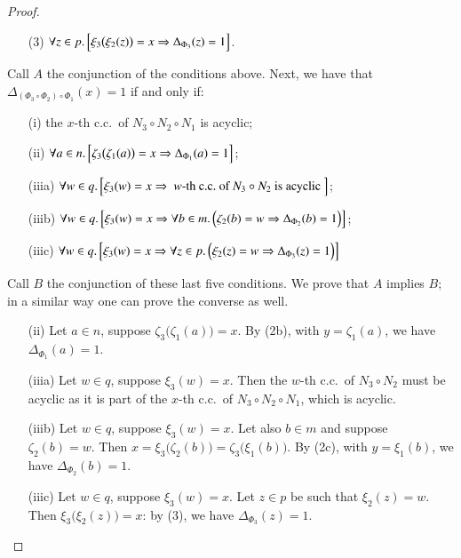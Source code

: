 \begin{proof}
\begin{enumerate}[labelindent=0pt]
        \item[(3)] $\forall z \in p \ldotp \Bigl[ \xi_3\bigl(\xi_2(z)\bigr) = x \implies \Delta_{\Phi_3} (z) = 1 \Bigr] $.
    \end{enumerate}
    Call $A$ the conjunction of the conditions above. Next, we have that $\Delta_{(\Phi_3 \circ \Phi_2) \circ \Phi_1}(x)=1$ if and only if:
    \begin{enumerate}[labelindent=0pt]
        \item[(i)] the $x$-th c.c.\ of $N_3 \circ N_2 \circ N_1$ is acyclic;
        \item[(ii)] $\forall a \in n \ldotp \Bigl[ \zeta_3 \bigl( \zeta_1(a) \bigr) =x \implies \Delta_{\Phi_1}(a)=1\Bigr]$;
        \item[(iiia)] $\forall w \in q \ldotp \Bigl[ \xi_3(w)=x \implies \text{ $w$-th c.c.\ of $N_3 \circ N_2$ is acyclic } \Bigr]$;
        \item[(iiib)] $\forall w \in q \ldotp \Bigl[ \xi_3(w)=x \implies \forall b \in m \ldotp \Bigl( \zeta_2(b)=w \implies \Delta_{\Phi_2}(b)=1 \Bigr) \Bigr]$;
        \item[(iiic)] $\forall w \in q \ldotp \Bigl[ \xi_3(w)=x \implies \forall z \in p \ldotp \Bigl( \xi_2(z)=w \implies \Delta_{\Phi_3}(z)=1 \Bigr) \Bigr]$
    \end{enumerate}
    Call $B$ the conjunction of these last five conditions. We prove that $A$ implies $B$; in a similar way one can prove the converse as well.
    \begin{enumerate}[labelindent=0pt]
        \item[(ii)] Let $a \in n$, suppose $\zeta_3\bigl(\zeta_1(a)\bigr) = x$. By (2b), with $y = \zeta_1(a)$, we have $\Delta_{\Phi_1}(a) = 1$.
        \item[(iiia)] Let $w \in q$, suppose $\xi_3(w)=x$. Then the $w$-th c.c.\ of $N_3 \circ N_2$ must be acyclic as it is part of the $x$-th c.c.\ of $N_3 \circ N_2 \circ N_1$, which is acyclic.
        \item[(iiib)] Let $w \in q$, suppose $\xi_3(w)=x$. Let also $b \in m$ and suppose $\zeta_2(b) = w$. Then $x = \xi_3\bigl( \zeta_2(b)\bigr) = \zeta_3 \bigl(\xi_1(b)\bigr)$. By (2c), with $y = \xi_1(b)$, we have $\Delta_{\Phi_2}(b)=1$.
        \item[(iiic)] Let $w \in q$, suppose $\xi_3(w)=x$. Let $z \in p$ be such that $\xi_2(z)=w$. Then $\xi_3\bigl(\xi_2(z)\bigr)=x$: by (3), we have $\Delta_{\Phi_3}(z)=1$.
    \end{enumerate}
    

\end{proof}
